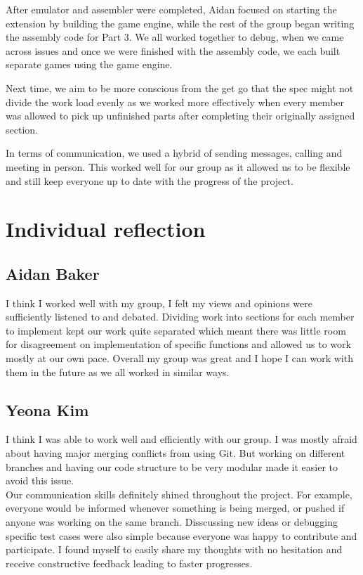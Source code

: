 \documentclass{article}
\begin{document}
After emulator and assembler were completed, Aidan focused on starting the extension by building the game engine, while the rest of the group began writing the assembly code for Part 3. We all worked together to debug, when we came across issues and once we were finished with the assembly code, we each built separate games using the game engine. 

Next time, we aim to be more conscious from the get go that the spec might not divide the work load evenly as we worked more effectively when every member was allowed to pick up unfinished parts after completing their originally assigned section.

In terms of communication, we used a hybrid of sending messages, calling and meeting in person. This worked well for our group as it allowed us to be flexible and still keep everyone up to date with the progress of the project.

\section{Individual reflection}

\subsection{Aidan Baker}
I think I worked well with my group, I felt my views and opinions were sufficiently listened to and debated. Dividing work into sections for each member to implement kept our work quite separated which meant there was little room for disagreement on implementation of specific functions and allowed us to work mostly at our own pace. 
Overall my group was great and I hope I can work with them in the future as we all worked in similar ways.

\subsection{Yeona Kim}
I think I was able to work well and efficiently with our group. I was mostly afraid about having major merging conflicts from using Git. But working on different branches and having our code structure to be very modular made it easier to avoid this issue.\\

Our communication skills definitely shined throughout the project. For example, everyone would be informed whenever something is being merged, or pushed if anyone was working on the same branch. Disscussing new ideas or debugging specific test cases were also simple because everyone was happy to contribute and participate. I found myself to easily share my thoughts with no hesitation and receive constructive feedback leading to faster progresses.
\end{document}
